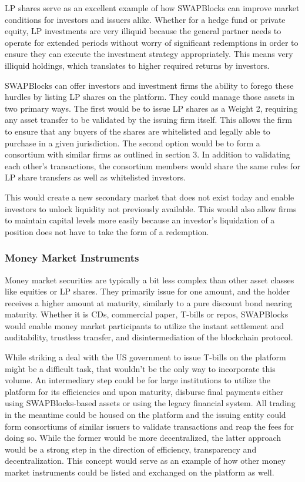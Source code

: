 \documentclass[12pt]{article}
\begin{document}
LP shares serve as an excellent example of how SWAPBlocks can improve market conditions for investors and 
issuers alike. Whether for a hedge fund or private equity, LP investments are very illiquid because the 
general partner needs to operate for extended periods without worry of significant redemptions in order to 
ensure they can execute the investment strategy appropriately. This means very illiquid holdings, 
which translates to higher required returns by investors.

SWAPBlocks can offer investors and investment firms the ability to forego these hurdles by listing LP shares on the 
platform. They could manage those assets in two primary ways. The first would be to issue LP shares as a Weight 2, 
requiring any asset transfer to be validated by the issuing firm itself. This allows the firm to ensure that any 
buyers of the shares are whitelisted and legally able to purchase in a given jurisdiction. The second option would 
be to form a consortium with similar firms as outlined in section 3. In addition to validating each other’s 
transactions, the consortium members would share the same rules for LP share transfers as well as whitelisted investors.

This would create a new secondary market that does not exist today and enable investors to unlock liquidity not 
previously available. This would also allow firms to maintain capital levels more easily because an investor's
liquidation of a position does not have to take the form of a redemption.

\subsubsection{Money Market Instruments}

Money market securities are typically a bit less complex than other asset classes like equities or LP shares. They 
primarily issue for one amount, and the holder receives a higher amount at maturity, similarly to a pure discount 
bond nearing maturity. Whether it is CDs, commercial paper, T-bills or repos, SWAPBlocks would enable money market 
participants to utilize the instant settlement and auditability, trustless transfer, and disintermediation of 
the blockchain protocol.

While striking a deal with the US government to issue T-bills on the platform might be a difficult task, that 
wouldn’t be the only way to incorporate this volume. An intermediary step could be for large institutions to 
utilize the platform for its efficiencies and upon maturity, disburse final payments either using SWAPBlocks-based 
assets or using the legacy financial system. All trading in the meantime could be housed on the platform and the 
issuing entity could form consortiums of similar issuers to validate transactions and reap the fees for doing so. 
While the former would be more decentralized, the latter approach would be a strong step in the direction of 
efficiency, transparency and decentralization. This concept would serve as an example of how other money market 
instruments could be listed and exchanged on the platform as well.
\end{document}
